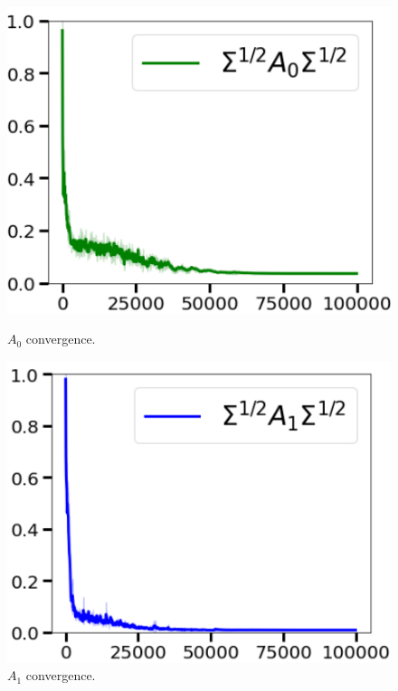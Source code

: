\documentclass[11pt]{article}
\theoremstyle{plain}
\theoremstyle{definition}
\theoremstyle{remark}
\numberwithin{equation}{section}
\begin{document}
\begin{figure}[htbp]
  \centering
  \begin{minipage}[b]{0.32\textwidth}
    \centering
    \includegraphics[width=\textwidth]{Sigma_A0.png}
    \caption{\( A_0 \) convergence.}
    \label{fig:sigma_a0}
  \end{minipage}
  \hfill
  \begin{minipage}[b]{0.32\textwidth}
    \centering
    \includegraphics[width=\textwidth]{Sigma_A1.png}
    \caption{\( A_1 \) convergence.}
    \label{fig:sigma_a1}
  \end{minipage}
  \hfill
  \begin{minipage}[b]{0.32\textwidth}

\end{minipage}
\end{figure}
\end{document}
